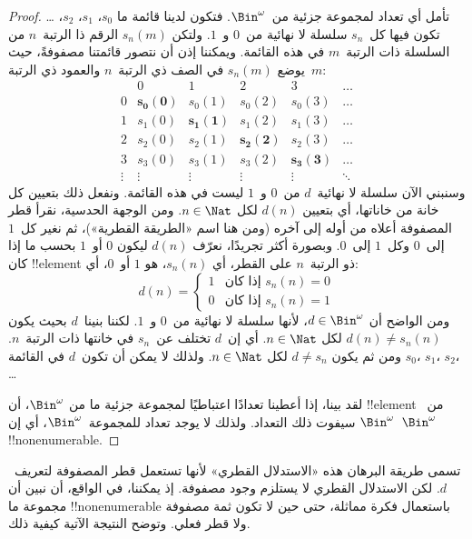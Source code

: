 \documentclass[../../../include/open-logic-section]{subfiles}
\begin{document}
\begin{proof}
تأمل أي تعداد لمجموعة جزئية من~$\Bin^\omega$. فتكون لدينا قائمة ما
$s_{0}$، $s_{1}$، $s_{2}$، \dots{} تكون فيها كل~$s_n$ سلسلة لا
نهائية من~$0$ و~$1$. ولتكن $s_n(m)$ الرقم ذا الرتبة~$n$ من السلسلة
ذات الرتبة~$m$ في هذه القائمة. ويمكننا إذن أن نتصور قائمتنا مصفوفةً،
حيث يوضع $s_n(m)$ في الصف ذي الرتبة~$n$ والعمود ذي الرتبة~$m$:
\[
\begin{array}{c|c|c|c|c|c}
& 0 & 1 & 2 & 3 & \dots \\\hline
0 & \mathbf{s_{0}(0)} & s_{0}(1) & s_{0}(2) & s_0(3) & \dots \\\hline
1 & s_{1}(0)& \mathbf{s_{1}(1)} & s_1(2) & s_1(3) & \dots \\\hline
2 & s_{2}(0)& s_{2}(1) & \mathbf{s_2(2)} & s_2(3) & \dots \\\hline
3 & s_{3}(0)& s_{3}(1) & s_3(2) & \mathbf{s_3(3)} & \dots \\\hline
\vdots & \vdots & \vdots & \vdots & \vdots & \mathbf{\ddots}
\end{array}
\]
وسنبني الآن سلسلة لا نهائية~$d$ من~$0$ و~$1$ ليست في هذه القائمة.
ونفعل ذلك بتعيين كل خانة من خاناتها، أي بتعيين $d(n)$ لكل $n \in
\Nat$. ومن الوجهة الحدسية، نقرأ قطر المصفوفة أعلاه من أوله إلى آخره
(ومن هنا اسم «الطريقة القطرية»)، ثم نغير كل~$1$ إلى~$0$ وكل~$1$
إلى~$0$. وبصورة أكثر تجريدًا، نعرّف $d(n)$ ليكون $0$ أو~$1$ بحسب ما
إذا كان !!{element} ذو الرتبة~$n$ على القطر، أي $s_n(n)$، هو $1$
أو~$0$، أي:
\[
d(n) =
\begin{cases}
1 & \text{إذا كان $s_{n}(n) = 0$}\\
0 & \text{إذا كان $s_{n}(n) = 1$}
\end{cases}
\]
ومن الواضح أن $d \in \Bin^\omega$، لأنها سلسلة لا نهائية من~$0$
و~$1$. لكننا بنينا~$d$ بحيث يكون $d(n) \neq s_n(n)$ لكل $n \in
\Nat$. أي إن~$d$ تختلف عن~$s_n$ في خانتها ذات الرتبة~$n$.
ومن ثم يكون $d \neq s_n$ لكل $n\in \Nat$. ولذلك لا يمكن أن تكون~$d$
في القائمة $s_0$، $s_1$، $s_2$،
\dots

لقد بينا، إذا أعطينا تعدادًا اعتباطيًا لمجموعة جزئية ما من
$\Bin^\omega$، أن !!{element} من~$\Bin^\omega$ سيفوت ذلك التعداد. ولذلك لا
يوجد تعداد للمجموعة~$\Bin^\omega$، أي إن~$\Bin^\omega$
!!{nonenumerable}.
\end{proof}

\begin{explain}
تسمى طريقة البرهان هذه «الاستدلال القطري» لأنها تستعمل قطر المصفوفة
لتعريف~$d$. لكن الاستدلال القطري لا يستلزم وجود مصفوفة. إذ يمكننا،
في الواقع، أن نبين أن مجموعة ما !!{nonenumerable} باستعمال فكرة
مماثلة، حتى حين لا تكون ثمة مصفوفة ولا قطر فعلي. وتوضح النتيجة الآتية
كيفية ذلك.
\end{explain}
\end{document}
